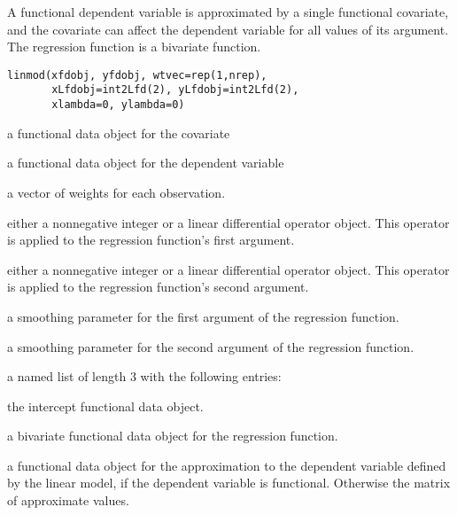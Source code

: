 \begin{Description}\relax
A functional dependent variable is approximated by a single
functional covariate, and the
covariate can affect the dependent variable for all
values of its argument.  The regression function is a bivariate function.
\end{Description}
\begin{Usage}
\begin{verbatim}
linmod(xfdobj, yfdobj, wtvec=rep(1,nrep),
       xLfdobj=int2Lfd(2), yLfdobj=int2Lfd(2),
       xlambda=0, ylambda=0)
\end{verbatim}
\end{Usage}
\begin{Arguments}
\begin{ldescription}
\item[\code{xfdobj}] a functional data object for the covariate

\item[\code{yfdobj}] a functional data object for the dependent variable

\item[\code{wtvec}] a vector of weights for each observation.

\item[\code{xLfdobj}] either a nonnegative integer or a linear differential operator
object.  This operator is applied to the regression function's
first argument.

\item[\code{yLfdobj}] either a nonnegative integer or a linear differential operator
object.  This operator is applied to the regression function's
second argument.

\item[\code{xlambda}] a smoothing parameter for the first argument of the regression
function.

\item[\code{ylambda}] a smoothing parameter for the second argument of the regression
function.

\end{ldescription}
\end{Arguments}
\begin{Value}
a named list of length 3 with the following entries:

\begin{ldescription}
\item[\code{alphafd}] the intercept functional data object.

\item[\code{regfd}] a bivariate functional data object for the regression function.

\item[\code{yhatfd}] a functional data object for the approximation to the dependent variable
defined by the linear model, if the dependent variable is functional.
Otherwise the matrix of approximate values.

\end{ldescription}
\end{Value}
